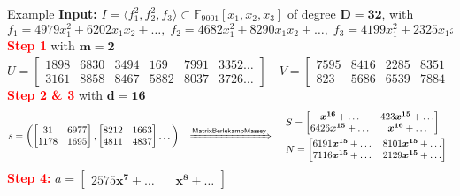\documentclass[final]{beamer}
\newlength{\twocolwid}
\begin{document}
\begin{frame}[t]
\begin{columns}[t]
\begin{column}{\twocolwid}
        \begin{alertblock}{{\sf Example}}
		\textbf{Input: }$I = \langle f_1^2, f_2^2,f_3 \rangle \subset \mathbb{F}_{9001}[x_1,x_2,x_3]$
                of degree $\boldsymbol{D=32}$,
                with
		$$ f_1 = 4979x_1^2 + 6202x_1x_2 + \dots, \;
		   f_2 = 4682x_1^2 + 8290x_1x_2 + \dots, \;
		   f_3 = 4199x_1^2 + 2325x_1x_2 + \dots$$
		\textcolor{red}{\bf Step 1} with $\boldsymbol{m = 2}$
		$$ U = \begin{bmatrix}
		1898 &6830 &3494 & 169 &7991 &3352 \dots \\
		3161 &8858 &8467 &5882 &8037 &3726 \dots
		\end{bmatrix} \quad
		V = \begin{bmatrix}
		7595 &8416 &2285 &8351 & 550 &7012 \dots \\
		823 &5686 &6539 &7884 &7105 &3427 \dots 
		\end{bmatrix}^t
		$$
		\textcolor{red}{\bf Step 2 \& 3} with $\boldsymbol{d = 16}$
		$$ s = \left(
		\begin{bmatrix}
		31  & 6977\\
		1178& 1695
		\end{bmatrix},
		\begin{bmatrix}
		8212&1663\\
		4811&4837
		\end{bmatrix}
		\dots
		\right)\,
                ~~\xRightarrow{\mathsf{MatrixBerlekampMassey}}~~
                \begin{array}{l}
		S = \begin{bmatrix}
		\boldsymbol{x^{16}} + \dots & 423\boldsymbol{x^{15}} +\dots\\
		6426\boldsymbol{x^{15}}+ \dots & \boldsymbol{x^{16}} + \dots
		\end{bmatrix} \, \\[1em]
		N = \begin{bmatrix}
		6191\boldsymbol{x^{15}} + \dots & 8101\boldsymbol{x^{15}} + \dots\\
		7116\boldsymbol{x^{15}} + \dots & 2129\boldsymbol{x^{15}} + \dots
		\end{bmatrix}
                \end{array}
		$$
		\textcolor{red}{\bf Step 4:}
		$%
                a = \begin{bmatrix}
		2575\boldsymbol{x^7}+\dots ~~&~~ \boldsymbol{x^8} + \dots
		\end{bmatrix}$


\end{alertblock}
\end{column}
\end{columns}
\end{frame}
\end{document}
